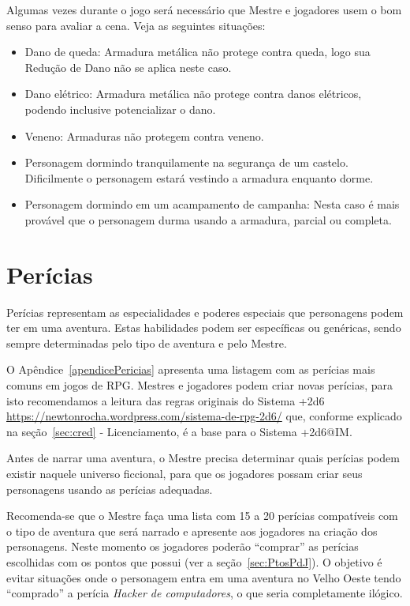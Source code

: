 Algumas vezes durante o jogo será necessário que Mestre e jogadores usem o bom senso para avaliar a cena. Veja as seguintes situações:

\begin{itemize}
	\item Dano de queda: Armadura metálica não protege contra queda, logo sua Redução de Dano não se aplica neste caso.
	\item Dano elétrico: Armadura metálica não protege contra danos elétricos, podendo inclusive potencializar o dano.
	\item Veneno: Armaduras não protegem contra veneno.
	\item Personagem dormindo tranquilamente na segurança de um castelo. Dificilmente o personagem estará vestindo a armadura enquanto dorme. 
	\item Personagem dormindo em um acampamento de campanha: Nesta caso é mais provável que o personagem durma usando a armadura, parcial ou completa.
\end{itemize}
	
\section{\label{subsecPericias}Perícias}
Perícias representam as especialidades e poderes especiais que personagens podem ter em uma aventura. Estas habilidades podem ser específicas ou genéricas, sendo sempre determinadas pelo tipo de aventura e pelo Mestre. 
 
O Apêndice~\ref{apendicePericias} apresenta uma listagem com as perícias mais comuns em jogos de RPG. Mestres e jogadores podem criar novas perícias, para isto recomendamos a leitura das regras originais do Sistema +2d6 \url{https://newtonrocha.wordpress.com/sistema-de-rpg-2d6/} que, conforme explicado na seção~\ref{sec:cred} - Licenciamento, é a base para o Sistema +2d6@IM.
 
Antes de narrar uma aventura, o Mestre precisa determinar quais perícias podem existir naquele universo ficcional, para que os jogadores possam criar seus personagens usando as perícias adequadas. 

Recomenda-se que o Mestre faça uma lista com 15 a 20 perícias compatíveis com o tipo de aventura que será narrado e apresente aos jogadores na criação dos personagens. Neste momento os jogadores poderão ``comprar'' as perícias escolhidas com os pontos que possui (ver a seção~\ref{sec:PtosPdJ}). O objetivo é evitar situações onde o personagem entra em uma aventura no Velho Oeste tendo ``comprado'' a perícia \emph{Hacker de computadores}, o que seria completamente ilógico.


